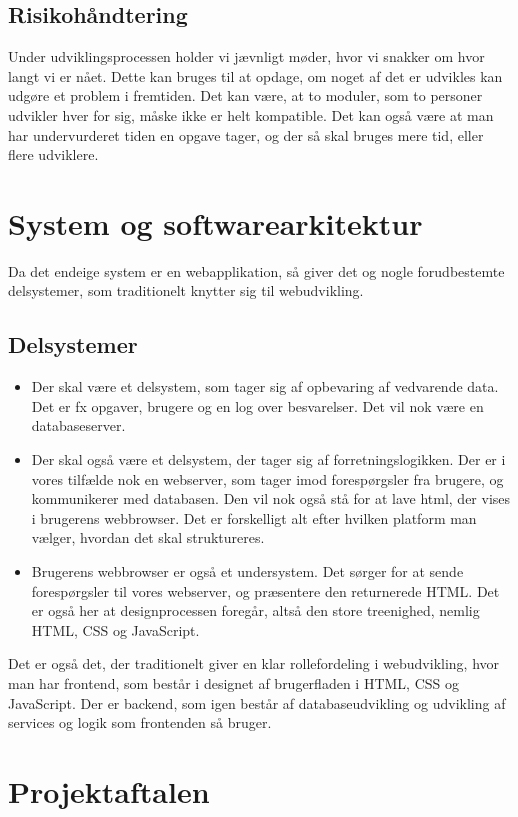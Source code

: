 \documentclass[12pt]{article}
\begin{document}
\subsection{Risikohåndtering}
Under udviklingsprocessen holder vi jævnligt møder, hvor vi snakker om hvor langt vi er nået. Dette kan bruges til at opdage, om noget af det er udvikles kan udgøre et problem i fremtiden. Det kan være, at to moduler, som to personer udvikler hver for sig, måske ikke er helt kompatible. Det kan også være at man har undervurderet tiden en opgave tager, og der så skal bruges mere tid, eller flere udviklere.


\section{System og softwarearkitektur}
Da det endeige system er en webapplikation, så giver det og nogle forudbestemte delsystemer, som traditionelt knytter sig til webudvikling.
\subsection{Delsystemer}
\begin{itemize}
    \item Der skal være et delsystem, som tager sig af opbevaring af vedvarende data. Det er fx opgaver, brugere og en log over besvarelser. Det vil nok være en databaseserver.
    \item Der skal også være et delsystem, der tager sig af forretningslogikken. Der er i vores tilfælde nok en webserver, som tager imod forespørgsler fra brugere, og kommunikerer med databasen. Den vil nok også stå for at lave html, der vises i brugerens webbrowser. Det er forskelligt alt efter hvilken platform man vælger, hvordan det skal struktureres.
    \item Brugerens webbrowser er også et undersystem. Det sørger for at sende forespørgsler til vores webserver, og præsentere den returnerede HTML. Det er også her at designprocessen foregår, altså den store treenighed, nemlig HTML, CSS og JavaScript.
\end{itemize}
Det er også det, der traditionelt giver en klar rollefordeling i webudvikling, hvor man har frontend, som består i designet af brugerfladen i HTML, CSS og JavaScript. Der er backend, som igen består af databaseudvikling og udvikling af services og logik som frontenden så bruger.
\section{Projektaftalen}
\end{document}
